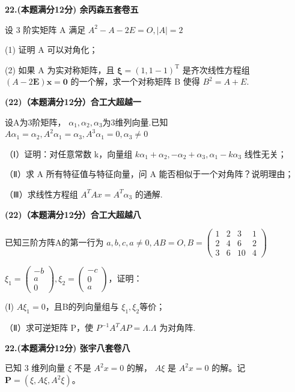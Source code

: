 \documentclass[a4paper,12pt]{article}
\begin{document}
\textbf{22.(本题满分12分) 余丙森五套卷五}

设 3 阶实矩阵 A 满足 $A^{2}-A-2E=O,\left|A\right|=2$

(1) 证明 A 可以对角化；

(2) 如果 A 为实对称矩阵，且 $\boldsymbol{\xi}=(1,1-1)^{\mathrm{T}}$ 是齐次线性方程组 $(A-2\boldsymbol{E})\boldsymbol{x}=\boldsymbol{0}$ 的一个解，求一个对称矩阵 B 使得 $B^{2}=A+E$.

\vspace{0.5cm}

\textbf{(22)（本题满分12分）合工大超越一}

设A为3阶矩阵， $\alpha_{1},\alpha_{2},\alpha_{3}$为3维列向量.已知 $A\alpha_{1}=\alpha_{2},A^{2}\alpha_{1}=\alpha_{3},A^{3}\alpha_{1}=0,\alpha_{3}\neq0$

（Ⅰ）证明：对任意常数 k，向量组 $k\alpha_{1}+\alpha_{2},-\alpha_{2}+\alpha_{3},\alpha_{1}-k\alpha_{3}$ 线性无关；

（Ⅱ）求 A 所有特征值与特征向量，问 A 能否相似于一个对角阵？说明理由；

（Ⅲ）求线性方程组 $A^{T}Ax=A^{T}\alpha_{3}$ 的通解.

\vspace{0.5cm}

\textbf{(22)（本题满分12分）合工大超越八}

已知三阶方阵A的第一行为 $a,b,c,a\neq0,AB=O,B=\begin{pmatrix}1&2&3&1\\2&4&6&2\\3&6&10&4\end{pmatrix}$

$\xi_{1}=\begin{pmatrix}-b\\a\\0\end{pmatrix},\xi_{2}=\begin{pmatrix}-c\\0\\a\end{pmatrix}$，证明：

(Ⅰ) $A\xi_{1}=0$，且B的列向量组与 $\xi_{1},\xi_{2}$等价；

（Ⅱ）求可逆矩阵 P，使 $P^{-1}A^{T}AP=\Lambda.\Lambda$ 为对角阵.

\vspace{0.5cm}

\textbf{22.(本题满分12分) 张宇八套卷八}

已知 3 维列向量 $\xi$ 不是 $A^{2}x = 0$ 的解， $A\xi$ 是 $A^{2}x = 0$ 的解。记 $\mathbf{P} = (\xi, A\xi, A^{2}\xi)$。
\end{document}
